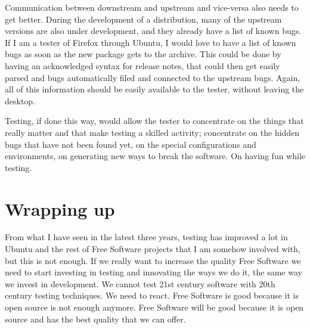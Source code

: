 Communication between downstream and upstream and vice-versa also needs to get
better. During the development of a distribution, many of the upstream versions
are also under development, and they already have a list of known bugs. If I am
a tester of Firefox through Ubuntu, I would love to have a list of known bugs as
soon as the new package gets to the archive. This could be done by having an
acknowledged syntax for release notes, that could then get easily parsed and
bugs automatically filed and connected to the upstream bugs. Again, all of this
information should be easily available to the tester, without leaving the
desktop.

Testing, if done this way, would allow the tester to concentrate on the things
that really matter and that make testing a skilled activity; concentrate on the
hidden bugs that have not been found yet, on the special configurations and
environments, on generating new ways to break the software. On having fun while
testing.

\section*{Wrapping up}

From what I have seen in the latest three years, testing has improved a lot in
Ubuntu and the rest of Free Software projects that I am somehow involved with, but this
is not enough. If we really want to increase the quality Free Software
we need to start investing in testing and innovating the ways we do it, the same
way we invest in development. We cannot test 21st century software with 20th
century testing techniques. We need to react. Free Software is good because it is
open source is not enough anymore. Free Software will be good because it is open
source and has the best quality that we can offer.
